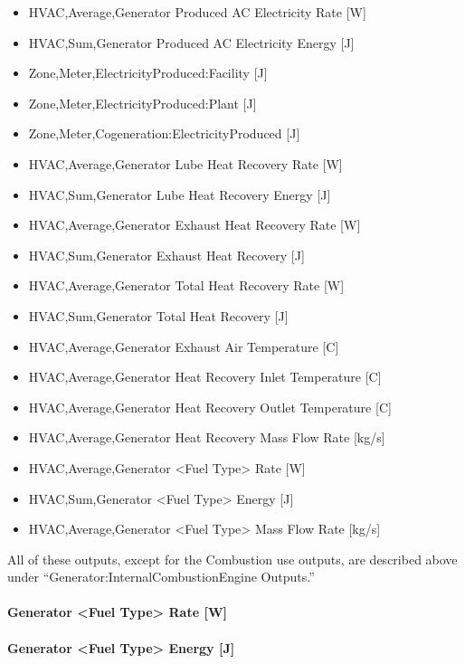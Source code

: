 \begin{itemize}
\item
  HVAC,Average,Generator Produced AC Electricity Rate {[}W{]}
\item
  HVAC,Sum,Generator Produced AC Electricity Energy {[}J{]}
\item
  Zone,Meter,ElectricityProduced:Facility {[}J{]}
\item
  Zone,Meter,ElectricityProduced:Plant {[}J{]}
\item
  Zone,Meter,Cogeneration:ElectricityProduced {[}J{]}
\item
  HVAC,Average,Generator Lube Heat Recovery Rate {[}W{]}
\item
  HVAC,Sum,Generator Lube Heat Recovery Energy {[}J{]}
\item
  HVAC,Average,Generator Exhaust Heat Recovery Rate {[}W{]}
\item
  HVAC,Sum,Generator Exhaust Heat Recovery {[}J{]}
\item
  HVAC,Average,Generator Total Heat Recovery Rate {[}W{]}
\item
  HVAC,Sum,Generator Total Heat Recovery {[}J{]}
\item
  HVAC,Average,Generator Exhaust Air Temperature {[}C{]}
\item
  HVAC,Average,Generator Heat Recovery Inlet Temperature {[}C{]}
\item
  HVAC,Average,Generator Heat Recovery Outlet Temperature {[}C{]}
\item
  HVAC,Average,Generator Heat Recovery Mass Flow Rate {[}kg/s{]}
\item
  HVAC,Average,Generator \textless{}Fuel Type\textgreater{} Rate {[}W{]}
\item
  HVAC,Sum,Generator \textless{}Fuel Type\textgreater{} Energy {[}J{]}
\item
  HVAC,Average,Generator \textless{}Fuel Type\textgreater{} Mass Flow Rate {[}kg/s{]}
\end{itemize}

All of these outputs, except for the Combustion use outputs, are described above under ``Generator:InternalCombustionEngine Outputs.''

\paragraph{Generator \textless{}Fuel Type\textgreater{} Rate {[}W{]}}\label{generator-fuel-type-rate-w-1}

\paragraph{Generator \textless{}Fuel Type\textgreater{} Energy {[}J{]}}\label{generator-fuel-type-energy-j-1}

